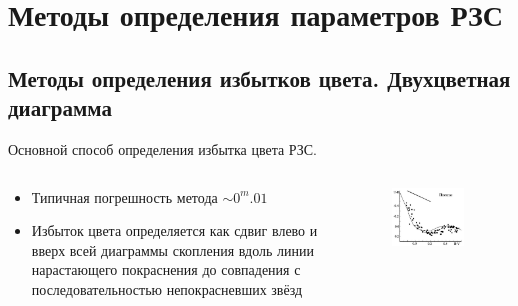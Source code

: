 \documentclass{beamer}
\begin{document}
    \section{Методы определения параметров РЗС}
    \subsection{Методы определения избытков цвета. Двухцветная диаграмма}
    \begin{frame}
        Основной способ определения избытка цвета РЗС.
        \begin{columns}
            \begin{column}{0.5\textwidth}
                    \begin{itemize}
                        \item Типичная погрешность метода $\sim 0^m.01$
                        \item Избыток цвета определяется как сдвиг 
                            влево и вверх всей диаграммы скопления вдоль линии нарастающего покраснения до совпадения с последовательностью непокрасневших звёзд
                    \end{itemize}
            \end{column}
            \begin{column}{0.5\textwidth}
                \begin{figure}
                \centering
                    \includegraphics[width=0.9\textwidth]{pictures/Pl2Col.jpg}
                \end{figure}
            \end{column}
        \end{columns}
    \end{frame}
\end{document}
